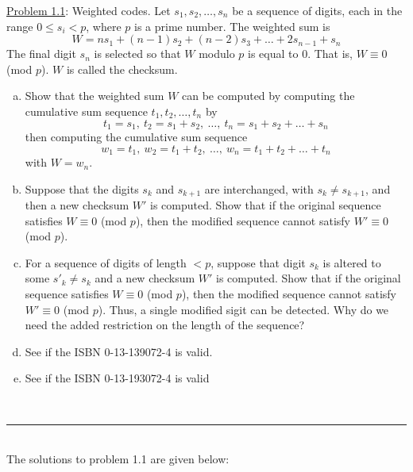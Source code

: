 \documentclass{article}
\newcommand{\statementsep}{\leavevmode\\[0.005in] \rule[\baselineskip/4]{\textwidth}{0.4pt}\leavevmode\\[0.005in]}
\begin{document}
\noindent\underline{Problem 1.1}: Weighted codes. Let $s_1,s_2,\hdots,s_n$ be a sequence of digits, each in the range $0\le s_i < p$, where $p$ is a prime number. The weighted sum is
\begin{equation*}
	W = ns_1 + (n-1)s_2 + (n-2)s_3 + \hdots + 2s_{n-1} + s_n
\end{equation*}
The final digit $s_n$ is selected so that $W$ modulo $p$ is equal to $0$. That is, $W\equiv 0$ (mod $p$). $W$ is called the checksum.
\begin{enumerate}[(a)]
	\item Show that the weighted sum $W$ can be computed by computing the cumulative sum sequence $t_1, t_2, \hdots, t_n$ by
\begin{equation*}
	t_1=s_1, \ t_2=s_1 + s_2, \ \hdots, \ t_n=s_1+s_2+\hdots+s_n
\end{equation*}
then computing the cumulative sum sequence
\begin{equation*}
	w_1=t_1,\ w_2=t_1 + t_2, \ \hdots, \ w_n = t_1 + t_2 + \hdots + t_n
\end{equation*}
with $W = w_n$.  
\item Suppose that the digits $s_k$ and $s_{k+1}$ are interchanged, with $s_k\ne s_{k+1}$, and then a new checksum $W'$ is computed. Show that if the original sequence satisfies $W\equiv 0$ (mod $p$), then the modified sequence cannot satisfy $W'\equiv 0$ (mod $p$).
\item For a sequence of digits of length $< p$, suppose that digit $s_k$ is altered to some $s'_k\ne s_k$ and a new checksum $W'$ is computed. Show that if the original sequence satisfies $W\equiv 0$ (mod $p$), then the modified sequence cannot satisfy $W' \equiv 0$ (mod $p$). Thus, a single modified sigit can be detected. Why do we need the added restriction on the length of the sequence?
\item See if the ISBN 0-13-139072-4 is valid.
\item See if the ISBN 0-13-193072-4 is valid
\end{enumerate}
\statementsep
The solutions to problem 1.1 are given below:
\end{document}
